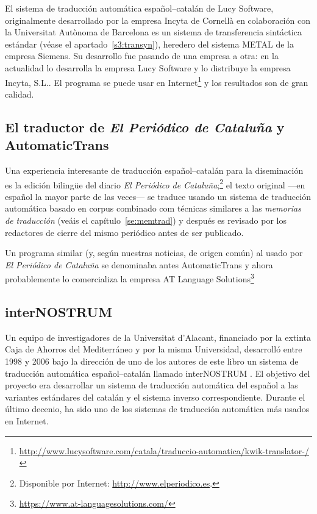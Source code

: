 {El sistema de traducción automática español--catalán de Lucy Software, originalmente desarrollado por la empresa Incyta de Cornellà en colaboración con la Universitat Autònoma de Barcelona es un sistema de transferencia sintáctica estándar (véase el apartado~\ref{s3:transyn}), heredero del sistema METAL de la empresa Siemens. Su desarrollo fue pasando de una empresa a otra: en la actualidad lo desarrolla la empresa Lucy Software y lo distribuye la empresa Incyta, S.L.. El programa se puede usar en Internet\footnote{\url{http://www.lucysoftware.com/catala/traduccio-automatica/kwik-translator-/}} y los resultados son de gran calidad. 

\subsection{El traductor de \emph{El Periódico de Cataluña} y AutomaticTrans} \label{ss:ePdC} 

Una experiencia interesante \citep{fiteperiodico} de traducción español--catalán para la diseminación es la edición bilingüe del diario \emph{El Periódico de Cataluña};\footnote{Disponible por Internet: \url{http://www.elperiodico.es}.} el texto original ---en español la mayor parte de las veces--- se traduce usando un sistema de traducción automática basado en corpus combinado com técnicas similares a las \emph{memorias de traducción} (veáis el capítulo~\ref{se:memtrad}) y después es revisado por los redactores de cierre del mismo periódico antes de ser publicado. 

Un programa similar (y, según nuestras noticias, de origen común) al usado por \emph{El Periódico de Cataluña} se denominaba antes AutomaticTrans y ahora probablemente lo comercializa la empresa AT Language Solutions\footnote{\url{https://www.at-languagesolutions.com/}} 

\subsection{interNOSTRUM} 

Un equipo de investigadores de la Universitat d'Alacant, financiado por la extinta Caja de Ahorros del Mediterráneo y por la misma Universidad, desarrolló entre 1998 y 2006 bajo la dirección de uno de los autores de este libro un sistema de traducción automática español--catalán llamado \textsf{interNOSTRUM} \citep{canals01a,canals01b}. El objetivo del proyecto era desarrollar un sistema de traducción automática del español a las variantes estándares del catalán y el sistema inverso correspondiente. Durante el último decenio, ha sido uno de los sistemas de traducción automática más usados en Internet. 

}
